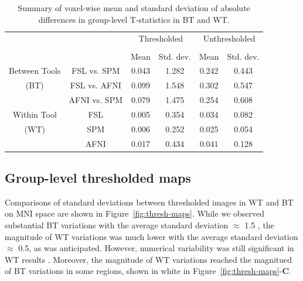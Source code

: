 \documentclass[conference]{IEEEtran}
\begin{document}
\setlength{\tabcolsep}{7pt}
\begin{table}[h]
    \centering
    \begin{tabular}{cccc|cc}
        \toprule
        \multirow{2}{*}{}& {} & \multicolumn{2}{c}{Thresholded} & \multicolumn{2}{c}{Unthresholded} \\
        \cmidrule{3-4} \cmidrule{5-6} \\
        {} & {} & Mean & Std. dev. & Mean & Std. dev. \\
        \midrule
        \rowcolor{lightgray}
        {Between Tools} & FSL vs. SPM        &  0.043       & 1.282      & 0.242     & 0.443  \\
        \rowcolor{lightgray}
        {(BT)} & FSL vs. AFNI         &  0.099       & 1.548      & 0.302     & 0.547  \\
        \rowcolor{lightgray}
        {} & AFNI vs. SPM         &  0.079       & 1.475      & 0.254     & 0.608  \\
        {Within Tool} & FSL    &  0.005       & 0.354      & 0.034     & 0.082  \\
        {(WT)}   & SPM    &  0.006       & 0.252      & 0.025     & 0.054  \\
        {}   & AFNI   &  0.017       & 0.434      & 0.041     & 0.128  \\
        \bottomrule
    \end{tabular}
    \caption{Summary of voxel-wise mean and standard deviation of absolute differences in group-level T-statistics in BT and WT. }
    \label{table:pipeline-stats}
\end{table}


\subsection{Group-level thresholded maps}

Comparisons of standard deviations between thresholded images  in WT and BT
on MNI space are shown in Figure~\ref{fig:thresh-maps}.
While we observed substantial BT variations with the average standard deviation $\approx$ 1.5 ,
the magnitude of WT variations was much lower with the average standard deviation $\approx$ 0.5,
as was anticipated. However, numerical variability was still significant in WT results .
Moreover, the magnitude of WT variations reached the magnitued of BT variations
in some regions, shown in white in Figure~\ref{fig:thresh-maps}-\textbf{C}.
\end{document}
